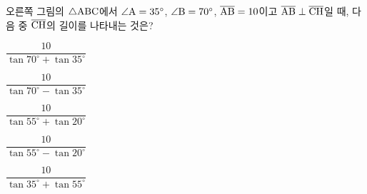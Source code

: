 \noindent\begin{minipage}[t]{0.58\linewidth}\vspace{0pt}\raggedright 오른쪽 그림의 $\triangle\mathrm{ABC}$에서 $\angle\mathrm{A}=35^\circ$, $\angle\mathrm{B}=70^\circ$, $\overline{\mathrm{AB}}=10$이고 $\overline{\mathrm{AB}}\perp\overline{\mathrm{CH}}$일 때, 다음 중 $\overline{\mathrm{CH}}$의 길이를 나타내는 것은?\end{minipage}\hfill\begin{minipage}[t]{0.4\linewidth}\vspace{0pt}\centering \resizebox{\ifdim\width>\linewidth\linewidth\else\width\fi}{!}{}\end{minipage}\par
\begin{choicesii}{\rule[-3ex]{0pt}{8ex}$\dfrac{10}{\tan 70^\circ+\tan 35^\circ}$}{\rule[-3ex]{0pt}{8ex}$\dfrac{10}{\tan 70^\circ-\tan 35^\circ}$}{\rule[-3ex]{0pt}{8ex}$\dfrac{10}{\tan 55^\circ+\tan 20^\circ}$}{\rule[-3ex]{0pt}{8ex}$\dfrac{10}{\tan 55^\circ-\tan 20^\circ}$}{\rule[-3ex]{0pt}{8ex}$\dfrac{10}{\tan 35^\circ+\tan 55^\circ}$}\end{choicesii}
